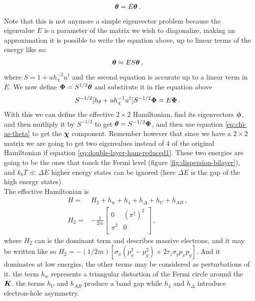 \begin{equation}
[h_\theta + u(E-h_\chi)^{-1}u^\dag]\vect \theta=E\vect \theta\,.
\end{equation}
Note that this is not anymore a simple eigenvector problem because the eigenvalue $E$ is a parameter of the matrix we wish to diagonalize, making an approximation it is possible to write the equation above, up to linear terms of the energy like so:
\begin{equation}
    [h_\theta + uh_\chi^{-1}u^\dag]\vect \theta\approx ES\vect \theta\,,
\end{equation}
where $S=1+uh_{\chi}^{-2}u^\dag$ and the second equation is accurate up to a linear term in $E$. We now define $\boldsymbol{\Phi}=S^{1/2}\boldsymbol{\theta}$ and substitute it in the equation above
\begin{equation}
    S^{-1/2}[h_\theta + uh_\chi^{-1}u^\dag]S^{-1/2}\boldsymbol{\Phi}=E\boldsymbol{\Phi}\,.
    \label{eq:double-layer-ham-reduced2}
\end{equation}
With this we can define the effective $2\times 2$ Hamiltonian, find its eigenvectors $\boldsymbol{\phi}$, and then mutliply it by $S^{-1/2}$ to get $\boldsymbol{\theta}=S^{-1/2}\boldsymbol{\Phi}$, and then use equation \ref{eq:chi-as-theta} to get the $\boldsymbol{\chi}$ component.
Remember however that since we have a $2\times 2$ matrix we are going to get two eigenvalues instead of $4$ of the original Hamiltonian if equation \ref{eq:double-layer-ham-reduced1}. These two energies are going to be the ones that touch the Fermi level (figure \ref{fig:dispersion-bilayer}), and $k_bT\ll \Delta E$ higher energy states can be ignored  (here $\Delta E$ is the gap of the high energy states)\\
The effective Hamiltonian is \cite{mccann2006landau,mucha2010electron}
\begin{equation}
\begin{split}
    H=&H_2+h_w+h_4+h_\Delta+h_U+h_{AB}\,,\\
    H_2=&-\frac1 {2m}\begin{bmatrix}
        0 & (\pi^\dag)^2\\
        \pi^2 &0\\
    \end{bmatrix}\,,
\end{split}
\label{eq:bilayer_ham}
\end{equation}
where $H_2$ can is the dominant term and describes massive electrons, and it may be written like so $H_2=-(1/2m)[\sigma_x(p_x^2-p_y^2)+2\tau_z\sigma_yp_xp_y]$. And it dominates at low energies, the other terms may be considered as perturbations of it. the term $h_w$ represents a triangular distortion of the Fermi circle around the $\boldsymbol{K}$. the terms $h_U$ and $h_{AB}$ produce a band gap while $h_4$ and $h_\Delta$ introduce electron-hole asymmetry.
